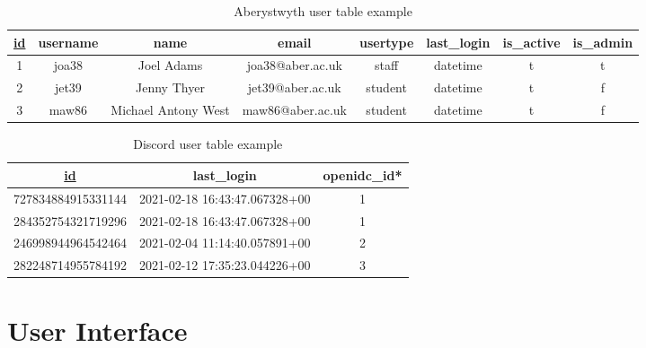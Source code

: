 \begin{table}[H]
	\centering
	\small
	\setlength\tabcolsep{2pt}
	\begin{tabular}{|c|c|c|c|c|c|c|c|}
		\hline
		\underline{id} & username & name & email & usertype & last\_login & is\_active & is\_admin \\
		\hline
		1 & joa38 & Joel Adams & joa38@aber.ac.uk & staff & datetime & t & t \\
		2 & jet39 & Jenny Thyer & jet39@aber.ac.uk & student & datetime & t & f \\
		3 & maw86 & Michael Antony West & maw86@aber.ac.uk & student & datetime & t & f \\
		\hline 
	\end{tabular}
	\caption{Aberystwyth user table example}
	\label{tab:aber-table}
\end{table}

\begin{table}[H]
	\centering
	\small
	\setlength\tabcolsep{2pt}
	\begin{tabular}{|c|c|c|}
		\hline
		\underline{id}                 & last\_login                   & openidc\_id* \\
		\hline
		727834884915331144 & 2021-02-18 16:43:47.067328+00 & 1           \\
		284352754321719296 & 2021-02-18 16:43:47.067328+00 & 1           \\
		246998944964542464 & 2021-02-04 11:14:40.057891+00 & 2           \\
		282248714955784192 & 2021-02-12 17:35:23.044226+00 & 3           \\
		\hline
	\end{tabular}
	\caption{Discord user table example}
	\label{tab:dis-table}
\end{table}

\section{User Interface}\label{sec2:ui}


